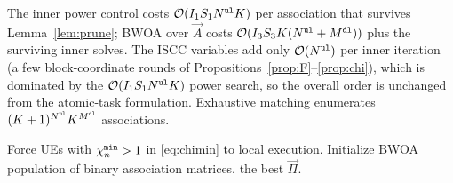 \documentclass[journal]{IEEEtran}
\begin{document}
The {\color{blue}inner power control} costs $\mathcal{O}(I_1 S_1 N^{\tt ul}K)$ per association that survives Lemma~\ref{lem:prune}; 
BWOA over $\vec{A}$ costs $\mathcal{O}(I_3 S_3 K(N^{\tt ul}+M^{\tt dl}))$ plus the surviving inner solves. The ISCC variables add only $\mathcal{O}(N^{\tt ul})$ per inner iteration (a few block-coordinate rounds of Propositions~\ref{prop:F}--\ref{prop:chi}), which is dominated by the $\mathcal{O}(I_1 S_1 N^{\tt ul}K)$ power search, so the overall order is unchanged from the atomic-task formulation. Exhaustive matching enumerates $(K+1)^{N^{\tt ul}}K^{M^{\tt dl}}$ associations.

{\begin{algorithm}[!t]
\DontPrintSemicolon
{}
Force UEs with $\chi_n^{\tt min}>1$ in \eqref{eq:chimin} to local execution.\;
Initialize BWOA population of binary association matrices.\;
\Return the best $\vec{\Pi}$.\;
\caption{Hybrid {\color{blue}WOA/PSO/PGD}--BWOA for SI-TNTN UAV edge-inference ISCC.}
\label{alg:hyb}
\end{algorithm}
}
\end{document}
